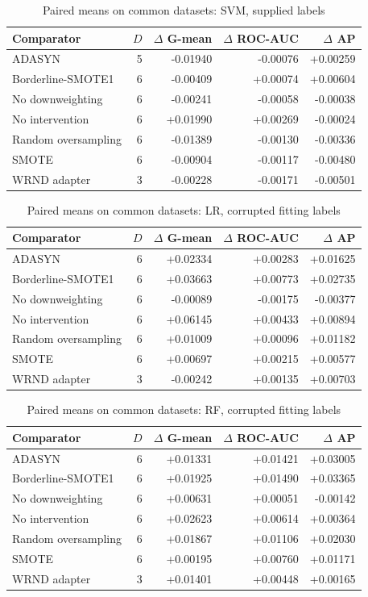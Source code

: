 \begin{table}[htbp]
\caption{Paired means on common datasets: SVM, supplied labels}
\centering\small
\begin{tabular}{lrrrr}
\hline
Comparator & $D$ & $\Delta$ G-mean & $\Delta$ ROC-AUC & $\Delta$ AP\\
\hline
ADASYN & 5 & -0.01940 & -0.00076 & +0.00259 \\
Borderline-SMOTE1 & 6 & -0.00409 & +0.00074 & +0.00604 \\
No downweighting & 6 & -0.00241 & -0.00058 & -0.00038 \\
No intervention & 6 & +0.01990 & +0.00269 & -0.00024 \\
Random oversampling & 6 & -0.01389 & -0.00130 & -0.00336 \\
SMOTE & 6 & -0.00904 & -0.00117 & -0.00480 \\
WRND adapter & 3 & -0.00228 & -0.00171 & -0.00501 \\
\hline
\end{tabular}
\end{table}
\begin{table}[htbp]
\caption{Paired means on common datasets: LR, corrupted fitting labels}
\centering\small
\begin{tabular}{lrrrr}
\hline
Comparator & $D$ & $\Delta$ G-mean & $\Delta$ ROC-AUC & $\Delta$ AP\\
\hline
ADASYN & 6 & +0.02334 & +0.00283 & +0.01625 \\
Borderline-SMOTE1 & 6 & +0.03663 & +0.00773 & +0.02735 \\
No downweighting & 6 & -0.00089 & -0.00175 & -0.00377 \\
No intervention & 6 & +0.06145 & +0.00433 & +0.00894 \\
Random oversampling & 6 & +0.01009 & +0.00096 & +0.01182 \\
SMOTE & 6 & +0.00697 & +0.00215 & +0.00577 \\
WRND adapter & 3 & -0.00242 & +0.00135 & +0.00703 \\
\hline
\end{tabular}
\end{table}
\begin{table}[htbp]
\caption{Paired means on common datasets: RF, corrupted fitting labels}
\centering\small
\begin{tabular}{lrrrr}
\hline
Comparator & $D$ & $\Delta$ G-mean & $\Delta$ ROC-AUC & $\Delta$ AP\\
\hline
ADASYN & 6 & +0.01331 & +0.01421 & +0.03005 \\
Borderline-SMOTE1 & 6 & +0.01925 & +0.01490 & +0.03365 \\
No downweighting & 6 & +0.00631 & +0.00051 & -0.00142 \\
No intervention & 6 & +0.02623 & +0.00614 & +0.00364 \\
Random oversampling & 6 & +0.01867 & +0.01106 & +0.02030 \\
SMOTE & 6 & +0.00195 & +0.00760 & +0.01171 \\
WRND adapter & 3 & +0.01401 & +0.00448 & +0.00165 \\
\hline
\end{tabular}
\end{table}

